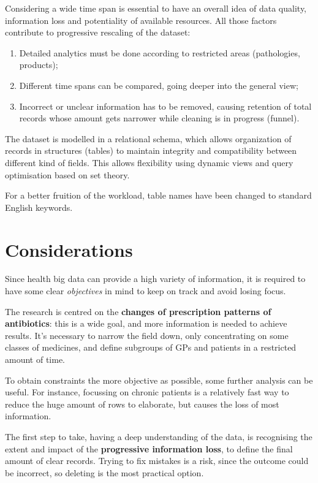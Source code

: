 Considering a wide time span is essential to have an overall idea of data quality, information loss and potentiality of available resources. All those factors contribute to progressive rescaling of the dataset:
\begin{enumerate}
	\item Detailed analytics must be done according to restricted areas (pathologies, products);
	\item Different time spans can be compared, going deeper into the general view;
	\item Incorrect or unclear information has to be removed, causing retention of total records whose amount gets narrower while cleaning is in progress (funnel).
\end{enumerate}

The dataset is modelled in a relational schema, which allows organization of records in structures (tables) to maintain integrity and compatibility between different kind of fields. This allows flexibility using dynamic views and query optimisation based on set theory. 

For a better fruition of the workload, table names have been changed to standard English keywords.

\section{Considerations}
Since health big data can provide a high variety of information, it is required to have some clear \textit{objectives} in mind to keep on track and avoid losing focus. 

The research is centred on the \textbf{changes of prescription patterns of antibiotics}: this is a wide goal, and more information is needed to achieve results. It's necessary to narrow the field down, only concentrating on some classes of medicines, and define subgroups of GPs and patients in a restricted amount of time.

To obtain constraints the more objective as possible, some further analysis can be useful. For instance, focussing on chronic patients is a relatively fast way to reduce the huge amount of rows to elaborate, but causes the loss of most information.

The first step to take, having a deep understanding of the data, is recognising the extent and impact of the \textbf{progressive information loss}, to define the final amount of clear records. Trying to fix mistakes is a risk, since the outcome could be incorrect, so deleting is the most practical option.

